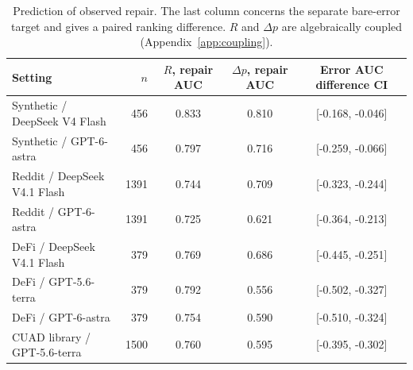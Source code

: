 \begin{table}[t]\centering\footnotesize
\caption{Prediction of observed repair. The last column concerns the separate bare-error target and gives a paired ranking difference. $R$ and $\Delta p$ are algebraically coupled (Appendix~\ref{app:coupling}).}
\label{tab:repair}
\begin{tabular}{@{}p{4.5cm}rccc@{}}\toprule
Setting & $n$ & $R$, repair AUC & $\Delta p$, repair AUC & Error AUC difference CI\\\midrule
Synthetic / DeepSeek V4 Flash & 456 & 0.833 & 0.810 & [-0.168, -0.046]\\
Synthetic / GPT-6-astra & 456 & 0.797 & 0.716 & [-0.259, -0.066]\\
Reddit / DeepSeek V4.1 Flash & 1391 & 0.744 & 0.709 & [-0.323, -0.244]\\
Reddit / GPT-6-astra & 1391 & 0.725 & 0.621 & [-0.364, -0.213]\\
DeFi / DeepSeek V4.1 Flash & 379 & 0.769 & 0.686 & [-0.445, -0.251]\\
DeFi / GPT-5.6-terra & 379 & 0.792 & 0.556 & [-0.502, -0.327]\\
DeFi / GPT-6-astra & 379 & 0.754 & 0.590 & [-0.510, -0.324]\\
CUAD library / GPT-5.6-terra & 1500 & 0.760 & 0.595 & [-0.395, -0.302]\\
\bottomrule\end{tabular}\end{table}